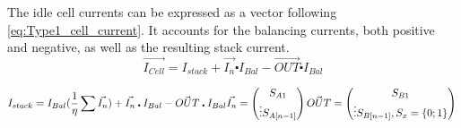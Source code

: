 The idle cell currents can be expressed as a vector following \ref{eq:Type1_cell_current}. It accounts for the balancing currents, both positive and negative, as well as the resulting stack current.
\begin{equation}\label{eq:Type1_cell_current}
    \vec{I_{Cell}}  = I_{stack} + \vec{I_n}\centerdot I_{Bal} - \vec{OUT}\centerdot I_{Bal}
\end{equation}

\begin{equation}\label{eq:Type1_cell_current}
    I_{stack}  = I_{Bal}(\frac{1}{\eta } \sum_{}^{}\vec{I_n}  ) + \vec{I_n}\centerdot I_{Bal} - \vec{OUT}\centerdot I_{Bal} \\
    \vec{I_n}  = \begin{pmatrix}
        S_{A1}\\
        \vdots
        S_{A[n-1]}
    \end{pmatrix} \\
    \vec{OUT}  = \begin{pmatrix}
        S_{B1}\\
        \vdots
        S_{B[n-1]} , S_{x}=\left\{0;1\right\} 
    \end{pmatrix} \\

\end{equation}